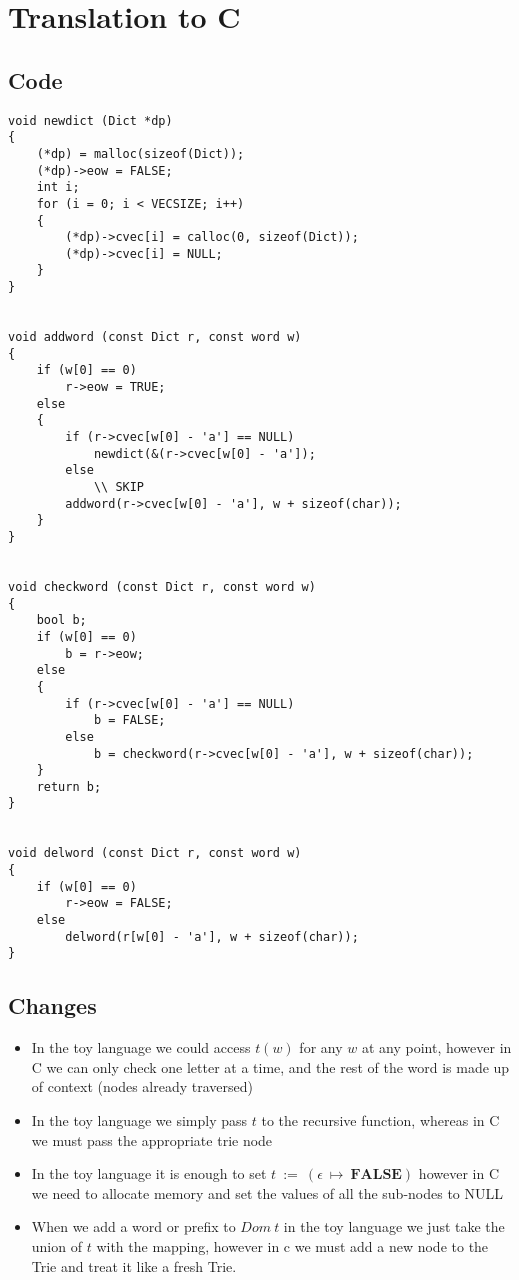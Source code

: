 \documentclass[a4paper, fleqn]{article}
\begin{document}
\clearpage\section{Translation to C}
\subsection{Code}
\begin{lstlisting}[style=customc]
void newdict (Dict *dp)
{
    (*dp) = malloc(sizeof(Dict));
    (*dp)->eow = FALSE;
    int i;
    for (i = 0; i < VECSIZE; i++)
	{
        (*dp)->cvec[i] = calloc(0, sizeof(Dict));
		(*dp)->cvec[i] = NULL;
    }
}


void addword (const Dict r, const word w)
{
    if (w[0] == 0)
        r->eow = TRUE;
    else
    {
        if (r->cvec[w[0] - 'a'] == NULL)
            newdict(&(r->cvec[w[0] - 'a']);
		else
		    \\ SKIP
        addword(r->cvec[w[0] - 'a'], w + sizeof(char));
    }
}


void checkword (const Dict r, const word w)
{
    bool b;
    if (w[0] == 0)
        b = r->eow;
    else
	{
        if (r->cvec[w[0] - 'a'] == NULL)
            b = FALSE;
		else
            b = checkword(r->cvec[w[0] - 'a'], w + sizeof(char));
    }
    return b;
}


void delword (const Dict r, const word w)
{
    if (w[0] == 0)
        r->eow = FALSE;
    else
        delword(r[w[0] - 'a'], w + sizeof(char));
}
\end{lstlisting}

\subsection{Changes}
\begin{itemize}
		\item In the toy language we could access $t(w)$ for any $w$ at any point, however in C we can only check one letter at a time, and the rest of the word is made up of context (nodes already traversed)
		\item In the toy language we simply pass $t$ to the recursive function, whereas in C we must pass the appropriate trie node
		\item In the toy language it is enough to set $t\ :=\ (\epsilon\ \mapsto\ \textbf{FALSE})$ however in C we need to allocate memory and set the values of all the sub-nodes to NULL
		\item When we add a word or prefix to $Dom\ t$ in the toy language we just take the union of $t$ with the mapping, however in c we must add a new node to the Trie and treat it like a fresh Trie. 
\end{itemize}
\end{document}
